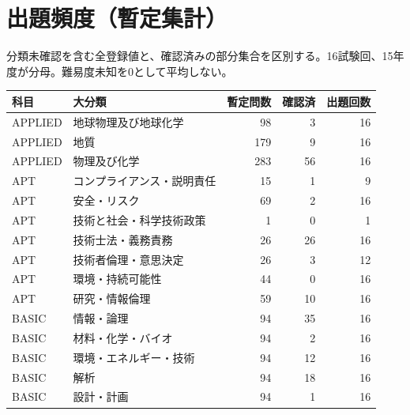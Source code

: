 \chapter{出題頻度（暫定集計）}
分類未確認を含む全登録値と、確認済みの部分集合を区別する。16試験回、15年度が分母。難易度未知を0として平均しない。
\begin{longtable}{p{.16\linewidth}p{.42\linewidth}rrr}
科目 & 大分類 & 暫定問数 & 確認済 & 出題回数\\\hline
APPLIED & 地球物理及び地球化学 & 98 & 3 & 16\\
APPLIED & 地質 & 179 & 9 & 16\\
APPLIED & 物理及び化学 & 283 & 56 & 16\\
APT & コンプライアンス・説明責任 & 15 & 1 & 9\\
APT & 安全・リスク & 69 & 2 & 16\\
APT & 技術と社会・科学技術政策 & 1 & 0 & 1\\
APT & 技術士法・義務責務 & 26 & 26 & 16\\
APT & 技術者倫理・意思決定 & 26 & 3 & 12\\
APT & 環境・持続可能性 & 44 & 0 & 16\\
APT & 研究・情報倫理 & 59 & 10 & 16\\
BASIC & 情報・論理 & 94 & 35 & 16\\
BASIC & 材料・化学・バイオ & 94 & 2 & 16\\
BASIC & 環境・エネルギー・技術 & 94 & 12 & 16\\
BASIC & 解析 & 94 & 18 & 16\\
BASIC & 設計・計画 & 94 & 1 & 16\\
\end{longtable}
